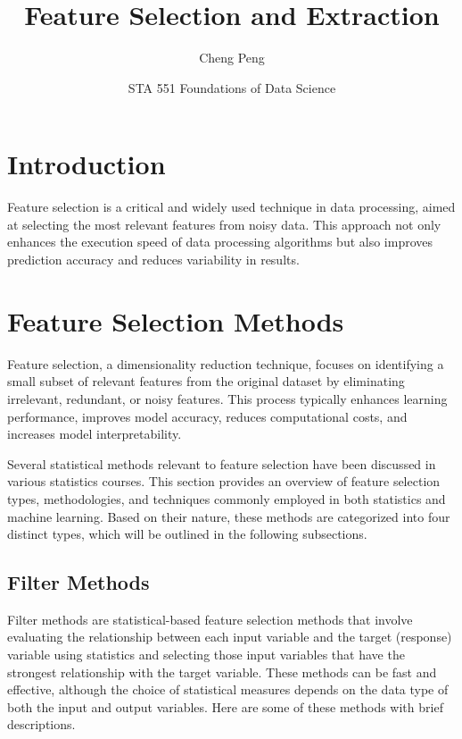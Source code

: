 \documentclass[
]{article}
\title{Feature Selection and Extraction}
\author{Cheng Peng}
\date{STA 551 Foundations of Data Science}
\begin{document}
\maketitle

{
\setcounter{tocdepth}{4}
\tableofcontents
}
\hypertarget{introduction}{%
\section{Introduction}\label{introduction}}

Feature selection is a critical and widely used technique in data
processing, aimed at selecting the most relevant features from noisy
data. This approach not only enhances the execution speed of data
processing algorithms but also improves prediction accuracy and reduces
variability in results.

\hypertarget{feature-selection-methods}{%
\section{Feature Selection Methods}\label{feature-selection-methods}}

Feature selection, a dimensionality reduction technique, focuses on
identifying a small subset of relevant features from the original
dataset by eliminating irrelevant, redundant, or noisy features. This
process typically enhances learning performance, improves model
accuracy, reduces computational costs, and increases model
interpretability.

Several statistical methods relevant to feature selection have been
discussed in various statistics courses. This section provides an
overview of feature selection types, methodologies, and techniques
commonly employed in both statistics and machine learning. Based on
their nature, these methods are categorized into four distinct types,
which will be outlined in the following subsections.

\hypertarget{filter-methods}{%
\subsection{Filter Methods}\label{filter-methods}}

Filter methods are statistical-based feature selection methods that
involve evaluating the relationship between each input variable and the
target (response) variable using statistics and selecting those input
variables that have the strongest relationship with the target variable.
These methods can be fast and effective, although the choice of
statistical measures depends on the data type of both the input and
output variables. Here are some of these methods with brief
descriptions.
\end{document}
